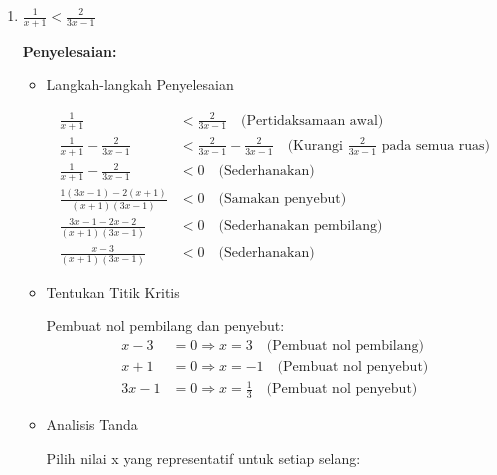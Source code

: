 \documentclass{article}
\begin{document}
\begin{enumerate}
\begin{itemize}
    \item HP: $[-1, 6]$
    \end{itemize}
    
    \item $\displaystyle \frac{1}{x+1} < \frac{2}{3x-1}$
    
    \textbf{Penyelesaian:}
    
    \begin{itemize}
    \item Langkah-langkah Penyelesaian
    
    \begin{align}
    \frac{1}{x+1} &< \frac{2}{3x-1} \quad \text{(Pertidaksamaan awal)} \\
    \frac{1}{x+1} - \frac{2}{3x-1} &< \frac{2}{3x-1} - \frac{2}{3x-1} \quad \text{(Kurangi $\frac{2}{3x-1}$ pada semua ruas)} \\
    \frac{1}{x+1} - \frac{2}{3x-1} &< 0 \quad \text{(Sederhanakan)} \\
    \frac{1(3x-1) - 2(x+1)}{(x+1)(3x-1)} &< 0 \quad \text{(Samakan penyebut)} \\
    \frac{3x-1-2x-2}{(x+1)(3x-1)} &< 0 \quad \text{(Sederhanakan pembilang)} \\
    \frac{x-3}{(x+1)(3x-1)} &< 0 \quad \text{(Sederhanakan)}
    \end{align}
    
    \item Tentukan Titik Kritis
    
    Pembuat nol pembilang dan penyebut:
    \begin{align}
    x-3 &= 0 \Rightarrow x = 3 \quad \text{(Pembuat nol pembilang)} \\
    x+1 &= 0 \Rightarrow x = -1 \quad \text{(Pembuat nol penyebut)} \\
    3x-1 &= 0 \Rightarrow x = \frac{1}{3} \quad \text{(Pembuat nol penyebut)}
    \end{align}
    
    \item Analisis Tanda
    
    Pilih nilai x yang representatif untuk setiap selang:
    

\end{itemize}
\end{enumerate}
\end{document}
